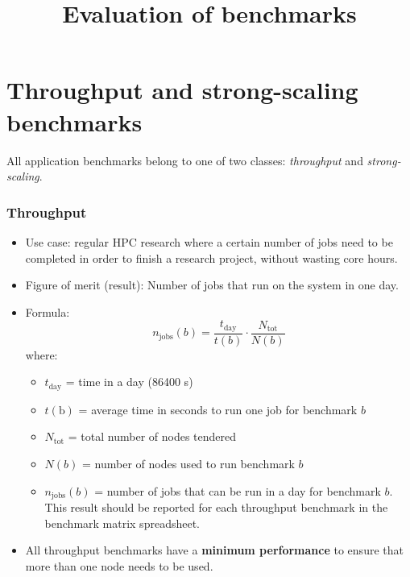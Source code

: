 \documentclass{article}
\begin{document}
\title{Evaluation of benchmarks}

\maketitle

\section*{Throughput and strong-scaling benchmarks}

All application benchmarks belong to one of two classes: \textit{throughput} and \textit{strong-scaling}.

\subsubsection*{Throughput}

\begin{itemize}
    \item Use case: regular HPC research where a certain number of jobs need to be completed in order to finish a research project, without wasting core hours. 
    \item Figure of merit (result): Number of jobs that run on the system in one day.
    \item Formula:
    \begin{equation}
        n_{\textrm{jobs}}(b) = \frac{t_{\textrm{day}}}{t(b)} \cdot \frac{N_{\textrm{tot}}}{N(b)}       
    \end{equation}
    where:
    \begin{itemize}
        \item $t_{\textrm{day}}$ = time in a day (86400 s)
        \item $t(\textrm{b})$ = average time in seconds to run one job for benchmark $b$
        \item $N_{\textrm{tot}}$ = total number of nodes tendered
        \item $N(b)$ = number of nodes used to run benchmark $b$
        \item $n_{\textrm{jobs}}(b)$ = number of jobs that can be run in a day for benchmark $b$. This result should be reported for each throughput benchmark in the benchmark matrix spreadsheet.
    \end{itemize}
    \item All throughput benchmarks have a \textbf{minimum performance} to ensure that more than one node needs to be used.

\end{itemize}
\end{document}

